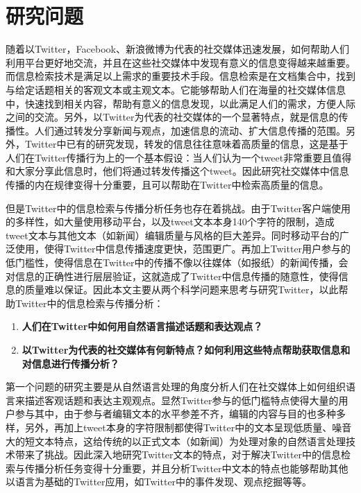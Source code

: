 \section{研究问题}
\label{point}
随着以Twitter，Facebook、新浪微博为代表的社交媒体迅速发展，如何帮助人们利用平台更好地交流，并且在这些社交媒体中发现有意义的信息变得越来越重要。而信息检索技术是满足以上需求的重要技术手段。信息检索是在文档集合中，找到与给定话题相关的客观文本或主观文本。它能够帮助人们在海量的社交媒体信息中，快速找到相关内容，帮助有意义的信息发现，以此满足人们的需求，方便人际之间的交流。另外，以Twitter为代表的社交媒体的一个显著特点，就是信息的传播性。人们通过转发分享新闻与观点，加速信息的流动、扩大信息传播的范围。另外，Twitter中已有的研究发现，转发的信息往往意味着高质量的信息，这是基于人们在Twitter传播行为上的一个基本假设：当人们认为一个tweet非常重要且值得和大家分享此信息时，他们将通过转发传播这个tweet。因此研究社交媒体中信息传播的内在规律变得十分重要，且可以帮助在Twitter中检索高质量的信息。

但是Twitter中的信息检索与传播分析任务也存在着挑战。由于Twitter客户端使用的多样性，如大量使用移动平台，以及tweet文本本身140个字符的限制，造成tweet文本与其他文本（如新闻）编辑质量与风格的巨大差异。同时移动平台的广泛使用，使得Twitter中信息传播速度更快，范围更广。再加上Twitter用户参与的低门槛性，使得信息在Twitter中的传播不像以往媒体（如报纸）的新闻传播，会对信息的正确性进行层层验证，这就造成了Twitter中信息传播的随意性，使得信息的质量难以保证。因此本文主要从两个科学问题来思考与研究Twitter，以此帮助Twitter中的信息检索与传播分析：
    \begin{enumerate}
    \item \textbf{人们在Twitter中如何用自然语言描述话题和表达观点？}
    \item \textbf{以Twitter为代表的社交媒体有何新特点？如何利用这些特点帮助获取信息和对信息进行传播分析？}
    \end{enumerate}  

第一个问题的研究主要是从自然语言处理的角度分析人们在社交媒体上如何组织语言来描述客观话题和表达主观观点。显然Twitter参与的低门槛特点使得大量的用户参与其中，由于参与者编辑文本的水平参差不齐，编辑的内容与目的也多种多样，另外，再加上tweet本身的字符限制都使得Twitter中的文本呈现低质量、噪音大的短文本特点，这给传统的以正式文本（如新闻）为处理对象的自然语言处理技术带来了挑战。因此深入地研究Twitter文本的特点，对于解决Twitter中的信息检索与传播分析任务变得十分重要，并且分析Twitter中文本的特点也能够帮助其他以语言为基础的Twitter应用，如Twitter中的事件发现、观点挖掘等等。

